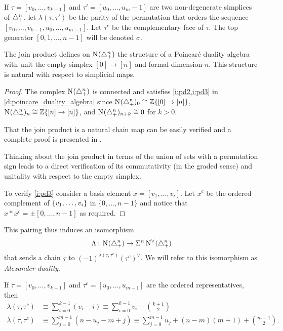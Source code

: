 \begin{notation}
	If $\tau = [v_0,\dots,v_{k-1}]$ and $\tau'=[u_0,\dots,u_{m}-1]$ are two non-degenerate simplices of $\triangle_{+}^n$, let $\lambda(\tau,\tau')$ be the parity of the permutation that orders the sequence $[v_0,\dots,v_{k-1},u_0,\dots,u_{m-1}]$. Let $\tau^c$ be the complementary face of $\tau$. The top generator $[0,1,\dots,n-1]$ will be denoted $\sigma$.
\end{notation}

\begin{theorem}
	The join product defines on $\operatorname{N}_{}(\triangle_{+}^{n})$ the structure of a Poincar\'e duality algebra with unit the empty simplex $[0] \to [n]$ and formal dimension $n$. This structure is natural with respect to simplicial maps.
\end{theorem}

\begin{proof}
	The complex $\operatorname{N}_{}(\triangle_{+}^{n})$ is connected and satisfies \cref{i:pd2,i:pd3} in \cref{d:poincare_duality_algebra} since $\operatorname{N}_{}(\triangle_{+}^{n})_0 \cong \mathbb{Z}\{[0] \to [n]\}$, $\operatorname{N}_{}(\triangle_{+}^{n})_{n} \cong \mathbb{Z}\{[n] \to [n]\}$, and $\operatorname{N}_{}(\triangle_{+}^{n})_{n+k} \cong 0$ for $k>0$.

	That the join product is a natural chain map can be easily verified and a complete proof is presented in \cite[p.19]{medina2020prop1}.

	Thinking about the join product in terms of the union of sets with a permutation sign leads to a direct verification of its commutativity (in the graded sense) and unitality with respect to the empty simplex.

	To verify \cref{i:pd3} consider a basis element $x = [v_1,\dots,v_i]$.
	Let $x^c$ be the ordered complement of $\{v_1,\dots,v_i\}$ in $\{0,\dots,n-1\}$ and notice that $x \ast x^c = \pm [0,\dots,n-1]$ as required.
\end{proof}

This pairing thus induces an isomorphism
\begin{equation}\label{eq:iso1}
	\Lambda \colon \operatorname{N}_{}(\triangle_{+}^n) \to \Sigma^{n}\operatorname{N}^\vee_{}(\triangle_{+}^n)
\end{equation}
that sends a chain $\tau$ to $(-1)^{\lambda(\tau,\tau^c)}(\tau^c)^\vee$. We will refer to this isomorphism as \emph{Alexander duality}.

\begin{remark}\label{remark:alex}
	If $\tau = [v_0,\dots,v_{k-1}]$ and $\tau^c = [u_0,\dots,u_{m-1}]$ are the ordered representatives, then
	\begin{align*}
		\lambda(\tau,\tau^c)&\equiv \sum_{i=0}^{k-1} (v_i-i) \equiv \sum_{i=0}^{k-1} v_i - \binom{k+1}{2} \\
		\lambda(\tau,\tau^c)&\equiv \sum_{j=0}^{m-1} (n-u_j-m+j) \equiv \sum_{j=0}^{m-1} u_j +(n-m)(m+1)+\binom{m+1}{2}.
	\end{align*}
\end{remark}

